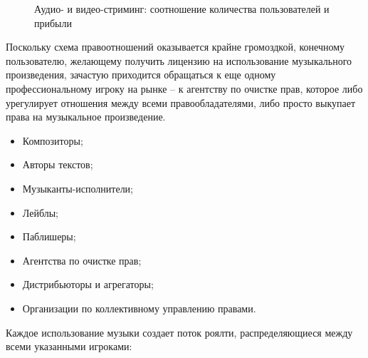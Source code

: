 \documentclass[12pt]{report}
\begin{document}
\begin{figure}[h]
\centering
\caption{Аудио- и видео-стриминг: соотношение количества пользователей и прибыли}
\vspace{20pt}
\userRevenue
{}
\end{figure}	

\begin{multicols}{2}
Поскольку схема правоотношений оказывается крайне громоздкой, конечному пользователю, желающему получить лицензию на использование музыкального произведения, зачастую приходится обращаться к еще одному профессиональному игроку на рынке – к агентству по очистке прав, которое либо урегулирует отношения между всеми правообладателями, либо просто выкупает права на музыкальное произведение.

\begin{itemize}
	\item Композиторы;
	\item Авторы текстов;
	\item Музыканты-исполнители;
	\item Лейблы;
	\item Паблишеры;
	\item Агентства по очистке прав;
	\item Дистрибьюторы и агрегаторы;
	\item Организации по коллективному управлению правами.
\end{itemize}
	
Каждое использование музыки создает поток роялти, распределяющиеся между всеми указанными игроками:
\end{multicols}
\end{document}
